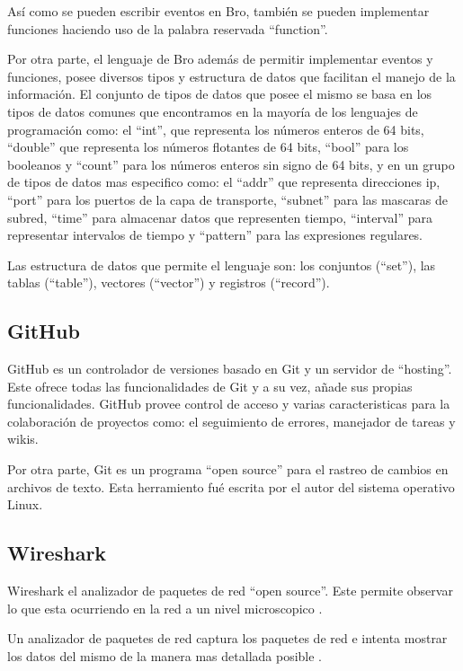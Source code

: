 Así como se pueden escribir eventos en Bro, también se pueden implementar funciones haciendo uso de la palabra reservada ``function''.

Por otra parte, el lenguaje de Bro además de permitir implementar eventos y funciones, posee diversos tipos y estructura de datos que facilitan el manejo de la información. 
El conjunto de tipos de datos que posee el mismo se basa en los tipos de datos comunes que encontramos en la mayoría de los lenguajes de programación como: el ``int'', que representa los números enteros de 64 bits, ``double'' que representa los números flotantes de 64 bits, ``bool'' para los booleanos y ``count''  para los números enteros sin signo de 64 bits, y en un grupo de tipos de datos  mas especifico como: el ``addr'' que representa direcciones ip, ``port'' para los puertos de la capa de transporte, ``subnet'' para las mascaras de subred, ``time'' para almacenar datos que representen tiempo, ``interval'' para representar intervalos de tiempo y ``pattern'' para las expresiones regulares.

Las estructura de datos que permite el lenguaje son: los conjuntos (``set''), las tablas (``table''), vectores (``vector'') y registros (``record'').

\subsection{GitHub}


GitHub es un controlador de versiones basado en Git y un servidor de ``hosting''. Este ofrece todas las funcionalidades de Git y a su vez, añade sus propias funcionalidades. GitHub provee control de acceso y varias caracteristicas para la colaboración de proyectos como: el seguimiento de errores, manejador de tareas y wikis. \cite{GitHub}

Por otra parte, Git es un programa ``open source'' para el rastreo de cambios en archivos de texto. Esta herramiento fué escrita por el autor del sistema operativo Linux. \cite{Git}

\subsection{Wireshark}

Wireshark el analizador de paquetes de red ``open source''. Este permite  observar lo que esta ocurriendo en la red a un nivel microscopico \cite{wireshark1}.

Un analizador de paquetes de red captura los paquetes de red e intenta mostrar los datos del mismo de la manera mas detallada posible \cite{wireshark2}.


